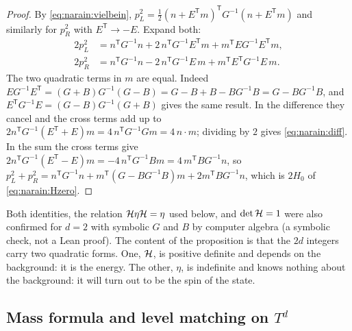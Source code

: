 \begin{proof}
By \eqref{eq:narain:vielbein}, $p_L^2=\frac12(n+E^{\mathsf T}m)^{\mathsf T}G^{-1}(n+E^{\mathsf T}m)$
and similarly for $p_R^2$ with $E^{\mathsf T}\to-E$. Expand both:
\begin{align*}
 2p_L^2&=n^{\mathsf T}G^{-1}n+2\,n^{\mathsf T}G^{-1}E^{\mathsf T}m+m^{\mathsf T}EG^{-1}E^{\mathsf T}m,\\
 2p_R^2&=n^{\mathsf T}G^{-1}n-2\,n^{\mathsf T}G^{-1}E\,m+m^{\mathsf T}E^{\mathsf T}G^{-1}E\,m .
\end{align*}
The two quadratic terms in $m$ are equal. Indeed
$EG^{-1}E^{\mathsf T}=(G+B)G^{-1}(G-B)=G-B+B-BG^{-1}B=G-BG^{-1}B$, and
$E^{\mathsf T}G^{-1}E=(G-B)G^{-1}(G+B)$ gives the same result. In the difference they cancel and
the cross terms add up to $2n^{\mathsf T}G^{-1}(E^{\mathsf T}+E)m=4\,n^{\mathsf T}G^{-1}Gm=4\,n\cdot m$;
dividing by $2$ gives \eqref{eq:narain:diff}. In the sum the cross terms give
$2n^{\mathsf T}G^{-1}(E^{\mathsf T}-E)m=-4\,n^{\mathsf T}G^{-1}Bm=4\,m^{\mathsf T}BG^{-1}n$, so
$p_L^2+p_R^2=n^{\mathsf T}G^{-1}n+m^{\mathsf T}(G-BG^{-1}B)m+2m^{\mathsf T}BG^{-1}n$, which is
$2H_0$ of \eqref{eq:narain:Hzero}.
\end{proof}

Both identities, the relation $\mathcal{H}\eta\mathcal{H}=\eta$ used below, and $\det\mathcal{H}=1$ were also
confirmed for $d=2$ with symbolic $G$ and $B$ by computer algebra (a symbolic check, not a
Lean proof). The content of the proposition is that the $2d$ integers carry two quadratic
forms. One, $\mathcal{H}$, is positive definite and depends on the background: it is the energy. The
other, $\eta$, is indefinite and knows nothing about the background: it will turn out to be
the spin of the state.

\subsection{Mass formula and level matching on \texorpdfstring{$T^d$}{Td}}
\label{sec:narain:massformula}

